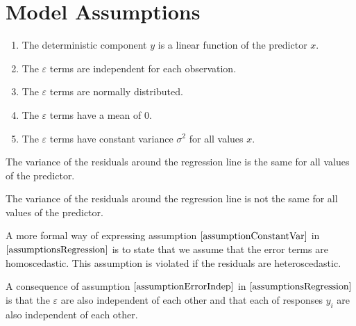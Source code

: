 \section{Model Assumptions}
\label{sectionModelAssumptions}

\begin{assumptions}
\label{assumptionsRegression}
\begin{enumerate}
\item	The deterministic component $y$ is a linear function of the predictor $x$.
\item	The $\varepsilon$ terms are independent for each observation. \label{assumptionErrorIndep}
\item	The $\varepsilon$ terms are normally distributed. \label{assumptionErrorNormal}
\item	The $\varepsilon$ terms have a mean of 0. \label{assumptionErrorMean0}
\item	The $\varepsilon$ terms have constant variance $\sigma^{2}$ for all values $x$.
	\label{assumptionConstantVar}
\end{enumerate}
\end{assumptions}

\begin{definition}[Homoscedacity]	
The variance of the residuals around the regression line 
is the same for all values of the predictor.
\end{definition}

\begin{definition}[Heteroscedasticity]	
The variance of the residuals around the regression line 
is not the same for all values of the predictor.
\end{definition}

A more formal way of expressing assumption $\ref{assumptionConstantVar}$ 
in $\ref{assumptionsRegression}$ is to state that we assume that 
the error terms are homoscedastic.
This assumption is violated if the residuals are heteroscedastic.

\begin{nt}
A consequence of assumption $\ref{assumptionErrorIndep}$ in $\ref{assumptionsRegression}$
is that the $\varepsilon$ are also independent of each other
and that each of responses $y_{i}$ are also independent of each other.
\end{nt}

